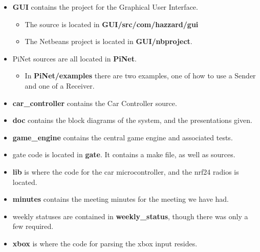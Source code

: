 \documentclass[letterpaper,fleqn]{article}
\begin{document}
\begin{itemize}
\item \textbf{GUI} contains the project for the Graphical User Interface.
\begin{itemize}
\item The source is located in \textbf{GUI/src/com/hazzard/gui}
\item The Netbeans project is located in \textbf{GUI/nbproject}.
\end{itemize}
\item PiNet sources are all located in \textbf{PiNet}.
\begin{itemize}
\item In \textbf{PiNet/examples} there are two examples, one of how to use a Sender and one of a Receiver.
\end{itemize}

\item \textbf{car\_controller} contains the Car Controller source.

\item \textbf{doc} contains the block diagrams of the system, and the presentations given.

\item \textbf{game\_engine} contains the central game engine and associated tests.

\item gate code is located in \textbf{gate}. It contains a make file, as well as sources.

\item \textbf{lib} is where the code for the car microcontroller, and the nrf24 radios is located.

\item \textbf{minutes} contains the meeting minutes for the meeting we have had.

\item weekly statuses are contained in \textbf{weekly\_status}, though there was only a few required.

\item \textbf{xbox} is where the code for parsing the xbox input resides.
\end{itemize}
\end{document}
